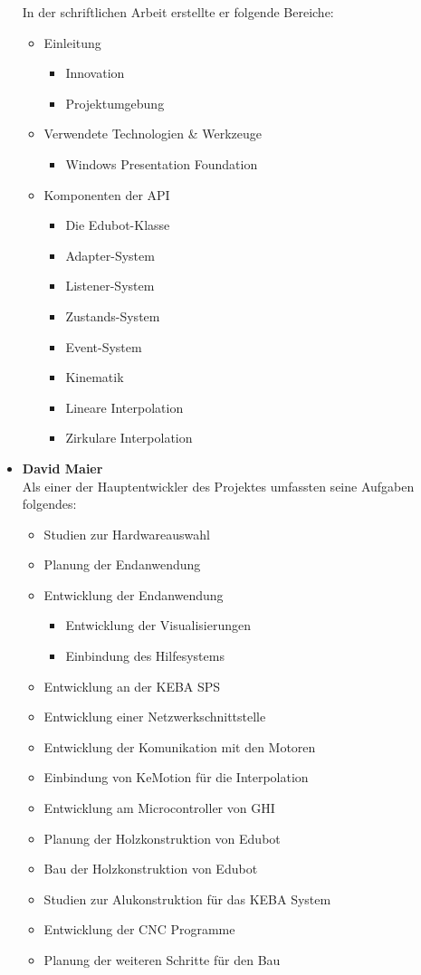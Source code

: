 \begin{itemize}
In der schriftlichen Arbeit erstellte er folgende Bereiche:
\begin{itemize}
\item Einleitung
\begin{itemize}
\item Innovation
\item Projektumgebung
\end{itemize}
\item Verwendete Technologien \& Werkzeuge
\begin{itemize}
\item Windows Presentation Foundation
\end{itemize}
\item Komponenten der API
\begin{itemize}
\item Die Edubot-Klasse
\item Adapter-System
\item Listener-System
\item Zustands-System
\item Event-System
\item Kinematik
\item Lineare Interpolation
\item Zirkulare Interpolation
\end{itemize}
\end{itemize}
     
\item \textbf{David Maier}\\
Als einer der Hauptentwickler des Projektes umfassten seine Aufgaben folgendes:
\begin{itemize}
\item Studien zur Hardwareauswahl
\item Planung der Endanwendung
\item Entwicklung der Endanwendung
\begin{itemize}
\item Entwicklung der Visualisierungen
\item Einbindung des Hilfesystems
\end{itemize}
\item Entwicklung an der KEBA SPS
\item Entwicklung einer Netzwerkschnittstelle 
\item Entwicklung der Komunikation mit den Motoren
\item Einbindung von KeMotion für die Interpolation
\item Entwicklung am Microcontroller von GHI
\item Planung der Holzkonstruktion von Edubot
\item Bau der Holzkonstruktion von Edubot
\item Studien zur Alukonstruktion für das KEBA System
\item Entwicklung der CNC Programme
\item Planung der weiteren Schritte für den Bau
\end{itemize}


\end{itemize}
